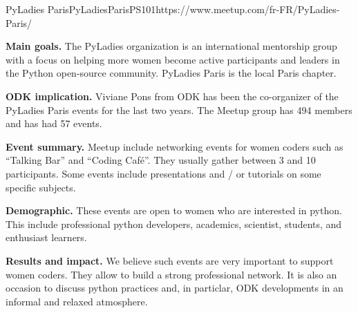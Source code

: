 \begin{event}{PyLadies Paris}{PyLadies}{Paris}{PS}{10}{1}{https://www.meetup.com/fr-FR/PyLadies-Paris/}

\textbf{Main goals.} The PyLadies organization is an international mentorship group with a focus on helping more women become active participants and leaders in the Python open-source community. PyLadies Paris is the local Paris chapter.

\textbf{ODK implication.} Viviane Pons from ODK has been the co-organizer of the PyLadies Paris events for the last two years. The Meetup group has 494 members and has had 57 events.

\textbf{Event summary.} Meetup include networking events for women coders such as ``Talking Bar'' and ``Coding Café''. They usually gather between 3 and 10 participants. Some events include presentations and / or tutorials on some specific subjects.

\textbf{Demographic.} These events are open to women who are interested in python. This include professional python developers, academics, scientist, students, and enthusiast learners.

\textbf{Results and impact.} We believe such events are very important to support women coders. They allow to build a strong professional network. It is also an occasion to discuss python practices and, in particlar, ODK developments in an informal and relaxed atmosphere.

\end{event}